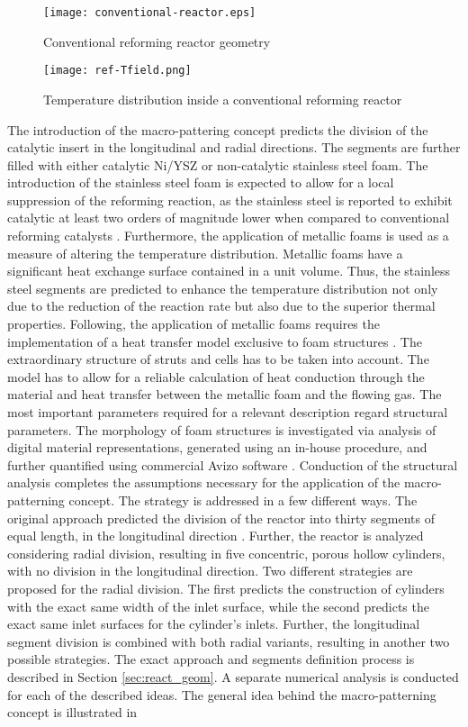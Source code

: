
\begin{figure}[h!]
\centering
\texttt{[image: conventional-reactor.eps]}
\caption{\label{fig:conv_reactor}{Conventional reforming reactor geometry}}
\end{figure}

\begin{figure}[h!]
\centering
\texttt{[image: ref-Tfield.png]}
\caption{\label{fig:conv_reactor_T}{Temperature distribution inside a conventional reforming reactor}}
\end{figure}

The introduction of the macro-pattering concept predicts the division of the catalytic insert in the longitudinal and radial directions. The segments are further filled with either catalytic Ni/YSZ or non-catalytic stainless steel foam. The introduction of the stainless steel foam is expected to allow for a local suppression of the reforming reaction, as the stainless steel is reported to exhibit catalytic at least two orders of magnitude lower when compared to conventional reforming catalysts \cite{Munster1981, Cheekatamarla2006}. Furthermore, the application of metallic foams is used as a measure of altering the temperature distribution. Metallic foams have a significant heat exchange surface contained in a unit volume. Thus, the stainless steel segments are predicted to enhance the temperature distribution not only due to the reduction of the reaction rate but also due to the superior thermal properties. Following, the application of metallic foams requires the implementation of a heat transfer model exclusive to foam structures \cite{Dai2010}. The extraordinary structure of struts and cells has to be taken into account. The model has to allow for a reliable calculation of heat conduction through the material and heat transfer between the metallic foam and the flowing gas.  The most important parameters required for a relevant description regard structural parameters. The morphology of foam structures is investigated via analysis of digital material representations, generated using an in-house procedure, and further quantified using commercial Avizo software \cite{Pajak2021IJHEa}. Conduction of the structural analysis completes the assumptions necessary for the application of the macro-patterning concept. The strategy is addressed in a few different ways. The original approach predicted the division of the reactor into thirty segments of equal length, in the longitudinal direction \cite{Pajak2018}. Further, the reactor is analyzed considering radial division, resulting in five concentric, porous hollow cylinders, with no division in the longitudinal direction. Two different strategies are proposed for the radial division. The first predicts the construction of cylinders with the exact same width of the inlet surface, while the second predicts the exact same inlet surfaces for the cylinder's inlets. Further, the longitudinal segment division is combined with both radial variants, resulting in another two possible strategies. The exact approach and segments definition process is described in Section \ref{sec:react_geom}. A separate numerical analysis is conducted for each of the described ideas. The general idea behind the macro-patterning concept is illustrated in 